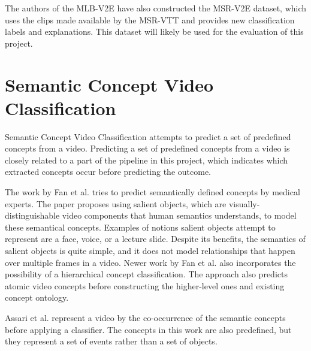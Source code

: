 The authors of the MLB-V2E \cite{RefWorks:RefID:16-2021automatic} have also constructed the MSR-V2E \cite{RefWorks:RefID:16-2021automatic} dataset, which uses the clips made available by the MSR-VTT and provides new classification labels and explanations.
This dataset will likely be used for the evaluation of this project.

\section{Semantic Concept Video Classification}

Semantic Concept Video Classification attempts to predict a set of predefined concepts from a video.
Predicting a set of predefined concepts from a video is closely related to a part of the pipeline in this project, which indicates which extracted concepts occur before predicting the outcome. 

The work by Fan et al. \cite{RefWorks:RefID:50-fan2004semantic} tries to predict semantically defined concepts by medical experts.
The paper proposes using salient objects, which are visually-distinguishable video components that human semantics understands, to model these semantical concepts.
Examples of notions salient objects attempt to represent are a face, voice, or a lecture slide.
Despite its benefits, the semantics of salient objects is quite simple, and it does not model relationships that happen over multiple frames in a video.
Newer work by Fan et al. \cite{RefWorks:RefID:51-jianping2007incorporating} also incorporates the possibility of a hierarchical concept classification. The approach also predicts atomic video concepts before constructing the higher-level ones and existing concept ontology.

Assari et al. \cite{RefWorks:RefID:52-assari2014video} represent a video by the co-occurrence of the semantic concepts before applying a classifier.
The concepts in this work are also predefined, but they represent a set of events rather than a set of objects.



